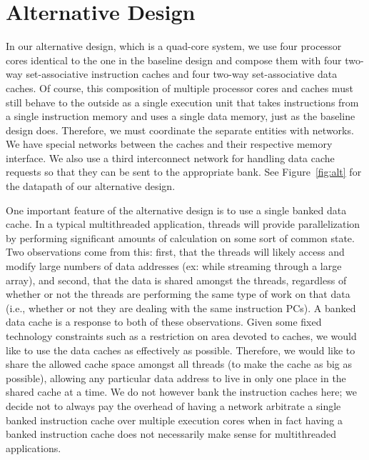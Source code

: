 \documentclass[10pt]{article}
\begin{document}


\section{Alternative Design}

In our alternative design, which is a quad-core system, we use four processor cores identical to the one in the baseline design and compose them with four two-way set-associative instruction caches and four two-way set-associative data caches. Of course, this composition of multiple processor cores and caches must still behave to the outside as a single execution unit that takes instructions from a single instruction memory and uses a single data memory, just as the baseline design does. Therefore, we must coordinate the separate entities with networks. We have special networks between the caches and their respective memory interface. We also use a third interconnect network for handling data cache requests so that they can be sent to the appropriate bank. See Figure~\ref{fig:alt} for the datapath of our alternative design.

One important feature of the alternative design is to use a single banked data cache. In a typical multithreaded application, threads will provide parallelization by performing significant amounts of calculation on some sort of common state. Two observations come from this: first, that the threads will likely access and modify large numbers of data addresses (ex: while streaming through a large array), and second, that the data is shared amongst the threads, regardless of whether or not the threads are performing the same type of work on that data (i.e., whether or not they are dealing with the same instruction PCs). A banked data cache is a response to both of these observations. Given some fixed technology constraints such as a restriction on area devoted to caches, we would like to use the data caches as effectively as possible. Therefore, we would like to share the allowed cache space amongst all threads (to make the cache as big as possible), allowing any particular data address to live in only one place in the shared cache at a time. We do not however bank the instruction caches here; we decide not to always pay the overhead of having a network arbitrate a single banked instruction cache over multiple execution cores when in fact having a banked instruction cache does not necessarily make sense for multithreaded applications.
\end{document}
